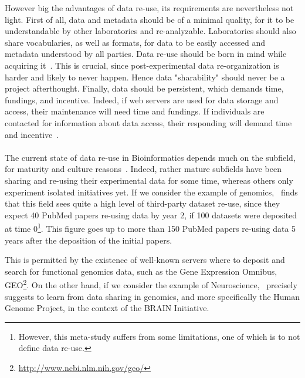 \documentclass[12pt]{article}
\begin{document}
However big the advantages of data re-use, its requirements are nevertheless not light. First of all, data and metadata should be of a minimal quality, for it to be understandable by other laboratories and re-analyzable. Laboratories should also share vocabularies, as well as formats, for data to be easily accessed and metadata understood by all parties. Data re-use should be born in mind while acquiring it~\cite{pmid23047157}. This is crucial, since post-experimental data re-organization is harder and likely to never happen. Hence data "sharability" should never be a project afterthought. Finally, data should be persistent, which demands time, fundings, and incentive. Indeed, if web servers are used for data storage and access, their maintenance will need time and fundings. If individuals are contacted for information about data access, their responding will demand time and incentive~\cite{pmid18636105}.

\paragraph*{} The current state of data re-use in Bioinformatics depends much on the subfield, for maturity and culture reasons~\cite{pmid24904347}. Indeed, rather mature subfields have been sharing and re-using their experimental data for some time, whereas others only experiment isolated initiatives yet. If we consider the example of genomics,~\cite{pmid24109559} finds that this field sees quite a high level of third-party dataset re-use, since they expect 40 PubMed papers re-using data by year 2, if 100 datasets were deposited at time 0\footnote{However, this meta-study suffers from some limitations, one of which is to not define data re-use.}. This figure goes up to more than 150 PubMed papers re-using data 5 years after the deposition of the initial papers. 

This is permitted by the existence of well-known servers where to deposit and search for functional genomics data, such as the Gene Expression Omnibus,  GEO\footnote{\href{http://www.ncbi.nlm.nih.gov/geo/}{http://www.ncbi.nlm.nih.gov/geo/}}. On the other hand, if we consider the example of Neuroscience,~\cite{pmid24904347} precisely suggests to learn from data sharing in genomics, and more specifically the Human Genome Project, in the context of the BRAIN Initiative. %
\end{document}
